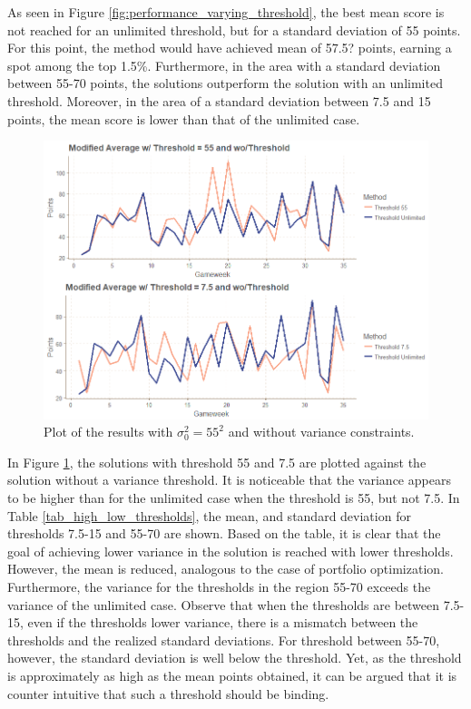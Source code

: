 As seen in Figure \ref{fig:performance_varying_threshold}, the best mean score is not reached for an unlimited threshold, but for a standard deviation of 55 points. For this point, the method would have achieved mean of 57.5? points, earning a spot among the top 1.5\%. Furthermore, in the area with a standard deviation between 55-70 points, the solutions outperform the solution with an unlimited threshold. Moreover, in the area of a standard deviation between 7.5 and 15 points, the mean score is lower than that of the unlimited case. 

\begin{figure}[H]
    \centering
    \includegraphics[scale=0.5]{fig/chapter_7/var_threshold.png}
    \caption{Plot of the results with $\sigma_0^{2} = 55^2$ and without variance constraints.}
\label{fig:performance_different_threshold}    
\end{figure}%
\newpar

In Figure \ref{fig:performance_different_threshold}, the solutions with threshold 55 and 7.5 are plotted against the solution without a variance threshold. It is noticeable that the variance appears to be higher than for the unlimited case when the threshold is 55, but not 7.5. In Table \ref{tab_high_low_thresholds}, the mean, and standard deviation for thresholds 7.5-15 and 55-70 are shown. Based on the table, it is clear that the goal of achieving lower variance in the solution is reached with lower thresholds. However, the mean is reduced, analogous to the case of portfolio optimization. Furthermore, the variance for the thresholds in the region 55-70 exceeds the variance of the unlimited case. Observe that when the thresholds are between 7.5-15, even if the thresholds lower variance, there is a mismatch between the thresholds and the realized standard deviations. For threshold between 55-70, however, the standard deviation is well below the threshold. Yet, as the threshold is approximately as high as the mean points obtained, it can be argued that it is counter intuitive that such a threshold should be binding.

